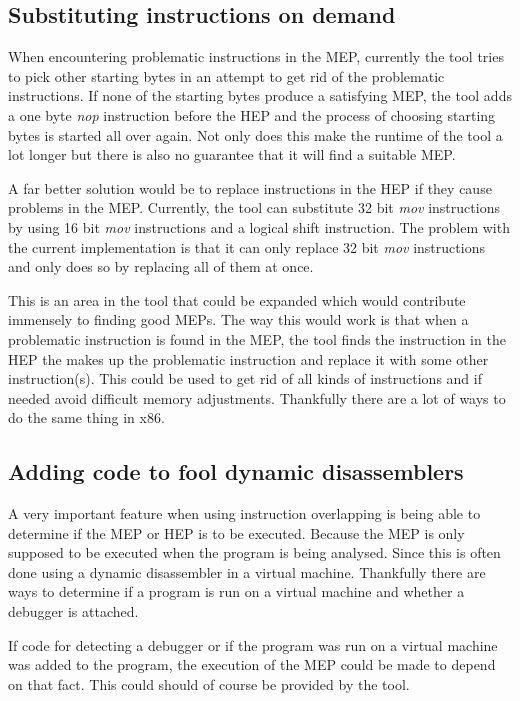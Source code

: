 \documentclass[11pt,twoside]{eitExjobb}
\begin{document}
\subsection{Substituting instructions on demand}
When encountering problematic instructions in the MEP, currently the tool tries to pick other starting bytes in an attempt to get rid of the problematic instructions. If none of the starting bytes produce a satisfying MEP, the tool adds a one byte \emph{nop} instruction before the HEP and the process of choosing starting bytes is started all over again. Not only does this make the runtime of the tool a lot longer but there is also no guarantee that it will find a suitable MEP.

A far better solution would be to replace instructions in the HEP if they cause problems in the MEP. Currently, the tool can substitute 32 bit \emph{mov} instructions by using 16 bit \emph{mov} instructions and a logical shift instruction. The problem with the current implementation is that it can only replace 32 bit \emph{mov} instructions and only does so by replacing all of them at once.

This is an area in the tool that could be expanded which would contribute immensely to finding good MEPs. The way this would work is that when a problematic instruction is found in the MEP, the tool finds the instruction in the HEP the makes up the problematic instruction and replace it with some other instruction(s). This could be used to get rid of all kinds of instructions and if needed avoid difficult memory adjustments. Thankfully there are a lot of ways to do the same thing in x86. 

\subsection{Adding code to fool dynamic disassemblers}
A very important feature when using instruction overlapping is being able to determine if the MEP or HEP is to be executed. Because the MEP is only supposed to be executed when the program is being analysed. Since this is often done using a dynamic disassembler in a virtual machine. Thankfully there are ways to determine if a program is run on a virtual machine and whether a debugger is attached.

If code for detecting a debugger or if the program was run on a virtual machine was added to the program, the execution of the MEP could be made to depend on that fact. This could should of course be provided by the tool.
\end{document}
